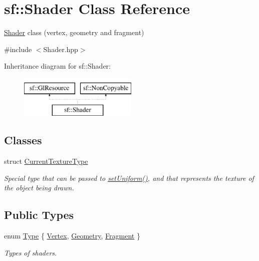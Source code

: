 \hypertarget{classsf_1_1_shader}{}\section{sf\+:\+:Shader Class Reference}
\label{classsf_1_1_shader}


\mbox{\hyperlink{classsf_1_1_shader}{Shader}} class (vertex, geometry and fragment)  




{\ttfamily \#include $<$Shader.\+hpp$>$}

Inheritance diagram for sf\+:\+:Shader\+:\begin{figure}[H]
\begin{center}
\leavevmode
\includegraphics[height=2.000000cm]{classsf_1_1_shader}
\end{center}
\end{figure}
\subsection*{Classes}
\begin{DoxyCompactItemize}
\item 
struct \mbox{\hyperlink{structsf_1_1_shader_1_1_current_texture_type}{Current\+Texture\+Type}}
\begin{DoxyCompactList}\small\item\em Special type that can be passed to \mbox{\hyperlink{classsf_1_1_shader_abf78e3bea1e9b0bab850b6b0a0de29c7}{set\+Uniform()}}, and that represents the texture of the object being drawn. \end{DoxyCompactList}\end{DoxyCompactItemize}
\subsection*{Public Types}
\begin{DoxyCompactItemize}
\item 
enum \mbox{\hyperlink{classsf_1_1_shader_afaa1aa65e5de37b74d047da9def9f9b3}{Type}} \{ \mbox{\hyperlink{classsf_1_1_shader_afaa1aa65e5de37b74d047da9def9f9b3a8718008f827eb32e29bbdd1791c62dce}{Vertex}}, 
\mbox{\hyperlink{classsf_1_1_shader_afaa1aa65e5de37b74d047da9def9f9b3a812421100fd57456727375938fb62788}{Geometry}}, 
\mbox{\hyperlink{classsf_1_1_shader_afaa1aa65e5de37b74d047da9def9f9b3ace6e88eec3a56b2e55ee3c8e64e9b89a}{Fragment}}
 \}
\begin{DoxyCompactList}\small\item\em Types of shaders. \end{DoxyCompactList}\end{DoxyCompactItemize}
